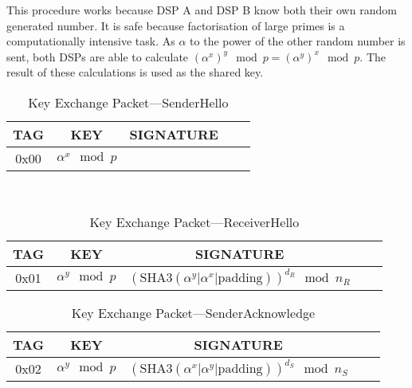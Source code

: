 \documentclass[a4paper]{article}
\begin{document}
This procedure works because DSP A and DSP B know both their own random generated number. It is safe because factorisation of large primes is a computationally intensive task. As $\alpha$ to the power of the other random number is sent, both DSPs are able to calculate $\left(\alpha^{x}\right)^{y}\mod{p} = \left(\alpha^{y}\right)^{x}\mod{p}$. The result of these calculations is used as the shared key.

\begin{table}[H]
    \begin{center}
        \begin{tabular}{| c | c | c | c | c |}
            \hline
            TAG & KEY & SIGNATURE \\ \hline
            0x00 & $\alpha^x\mod{p}$ & \\
            \hline
        \end{tabular}
    \end{center}
    \
    \caption{Key Exchange Packet---SenderHello}
    \label{tab:key_exchange_packet_senderhello}
\end{table}
\begin{table}[H]
    \begin{center}
        \begin{tabular}{| c | c | c | c | c |}
            \hline
            TAG & KEY & SIGNATURE \\ \hline
            0x01 & $\alpha^y\mod{p}$ & $\left(\text{SHA3}\left(\alpha^y \big| \alpha^x \big| \text{padding} \right)\right)^{d_R}\mod{n_R}$\\
            \hline
        \end{tabular}
    \end{center}
    
    \caption{Key Exchange Packet---ReceiverHello}
    \label{tab:key_exchange_packet_receiverhello}
\end{table}
\begin{table}[H]
    \begin{center}
        \begin{tabular}{| c | c | c | c | c |}
            \hline
            TAG & KEY & SIGNATURE \\ \hline
            0x02 & $\alpha^y\mod{p}$ & $\left(\text{SHA3}\left(\alpha^x \big| \alpha^y \big| \text{padding} \right)\right)^{d_S}\mod{n_S}$\\
            \hline
        \end{tabular}
    \end{center}
    
    \caption{Key Exchange Packet---SenderAcknowledge}
    \label{tab:key_exchange_packet_senderacknowledge}
\end{table}
\end{document}
